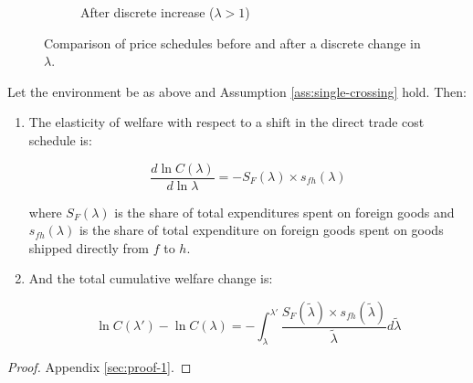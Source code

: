 \begin{figure}[htp]
\begin{subfigure}[b]{0.48\textwidth}
    \caption{After discrete increase (\(\lambda>1\))}\label{fig:panelB}
  \end{subfigure}
  \caption{Comparison of price schedules before and after a discrete change in \(\lambda\).}
  \label{fig:two_panels}
\end{figure}

\begin{proposition} \label{prop:welfare} Let the environment be as above and Assumption \ref{ass:single-crossing} hold. Then:

\begin{enumerate}
    \item The elasticity of welfare with respect to a shift in the direct trade cost schedule is:

    \[ \frac{d \ln C(\lambda)}{ d \ln \lambda} = - S_F(\lambda) \times s_{fh}(\lambda) \]

    where $S_F(\lambda)$ is the share of total expenditures spent on foreign goods and $s_{fh}(\lambda)$ is the share of total expenditure on foreign goods spent on goods shipped directly from $f$ to $h$.

    \item And the total cumulative welfare change is:

    \[ \ln C(\lambda') - \ln C(\lambda) =  - \int_\lambda^{\lambda'} \frac{S_F(\tilde{\lambda}) \times s_{fh}(\tilde{\lambda})}{\tilde{\lambda}}   d \tilde{\lambda}   \]
\end{enumerate}
    
\end{proposition}

\begin{proof}
    Appendix \ref{sec:proof-1}.
\end{proof}

